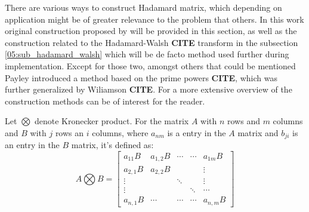 There are various ways to construct Hadamard matrix, which depending on application might be of greater relevance to the problem that others. In this work original construction proposed by \cite{05_sylvester_construction} will be provided in this section, as well as the construction related to the Hadamard-Walsh {\color{red} \textbf{CITE}} transform in the subsection \ref{05:sub_hadamard_walsh} which will be de facto method used further during implementation. Except for those two, amongst others that could be mentioned Payley introduced a method based on the prime powers {\color{red} \textbf{CITE}}, which was further generalized by Wiliamson {\color{red} \textbf{CITE}}. For a more extensive overview of the construction methods \cite{05_hedayat_wallis_hadamard_matrices} can be of interest for the reader.

Let $\bigotimes$ denote Kronecker product. For the matrix $A$ with $n$ rows and $m$ columns and $B$ with $j$ rows an $i$ columns, where $a_{nm}$ is a entry in the $A$ matrix and $b_{ji}$ is an entry in the $B$ matrix, it's defined as:
\begin{equation}
    A \bigotimes B = \begin{bmatrix}
                    a_{11}B  & a_{1,2}B & \cdots  & \cdots & a_{1m}B \\
                    a_{2,1}B & a_{2,2}B &         &        & \vdots \\
                    \vdots   &          & \ddots  &        & \vdots \\
                    \vdots   &          &         & \ddots & \cdots \\
                    a_{n,1}B & \cdots   & \cdots  & \cdots & a_{n,m}B 
\end{bmatrix}
\end{equation}

